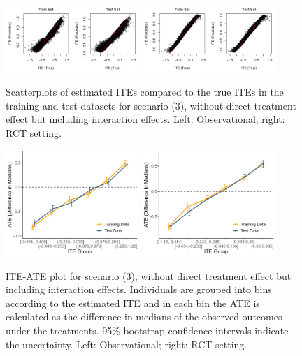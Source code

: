 \begin{figure}[htbp]
\centering
\includegraphics[width=0.45\textwidth]{img/results/observ_scenario3_ITE_scatter_train_test.png}
\includegraphics[width=0.45\textwidth]{img/results/rct_scenario3_ITE_scatter_train_test.png}
\caption{Scatterplots of estimated ITEs compared to the true ITEs in the training and test datasets for scenario (3), without direct treatment effect but including interaction effects. Left: Observational; right: RCT setting.}
\label{fig:scenario3_ite_scatter_train_test}
\end{figure}




\begin{figure}[htbp]
\centering
\includegraphics[width=0.45\textwidth]{img/results/observ_scenario3_ITE_cATE.png}
\includegraphics[width=0.45\textwidth]{img/results/rct_scenario3_ITE_cATE.png}
\caption{ITE-ATE plot for scenario (3), without direct treatment effect but including interaction effects. Individuals are grouped into bins according to the estimated ITE and in each bin the ATE is calculated as the difference in medians of the observed outcomes under the treatments. 95\% bootstrap confidence intervals indicate the uncertainty. Left: Observational; right: RCT setting.}
\label{fig:scenario3_ite_cATE}
\end{figure}


